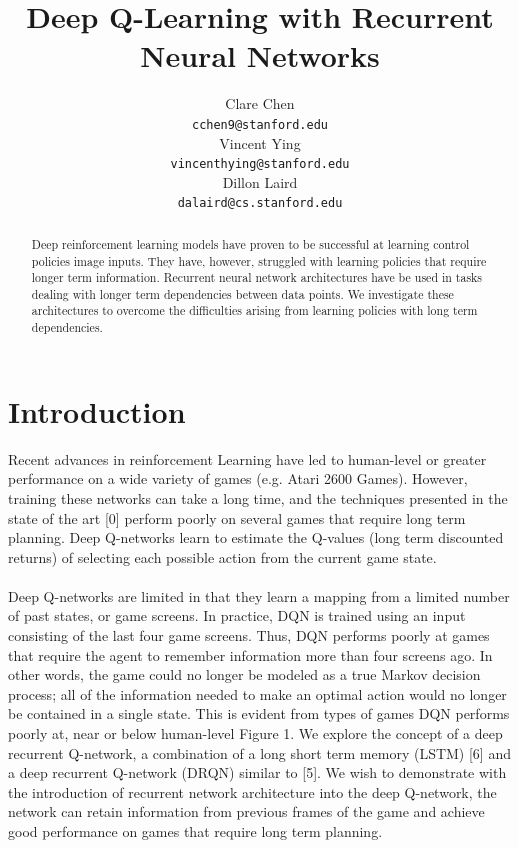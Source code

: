 \documentclass{article}
\title{Deep Q-Learning with Recurrent Neural Networks}
\author{
  Clare Chen \\
  \texttt{cchen9@stanford.edu} \\
  \And
  Vincent Ying \\
  \texttt{vincenthying@stanford.edu} \\
  \And
  Dillon Laird \\
  \texttt{dalaird@cs.stanford.edu} \\
}
\begin{document}

\maketitle

\begin{abstract}
  Deep reinforcement learning models have proven to be successful at learning
  control policies image inputs. They have, however, struggled with learning
  policies that require longer term information. Recurrent neural network
  architectures have be used in tasks dealing with longer term dependencies
  between data points. We investigate these architectures to overcome the
  difficulties arising from learning policies with long term dependencies.
\end{abstract}

\section{Introduction}
    Recent advances in reinforcement Learning have led to human-level or greater
    performance on a wide variety of games (e.g. Atari 2600 Games).  However,
    training these networks can take a long time, and the techniques presented in
    the state of the art [0] perform poorly on several games that require long
    term planning.  Deep Q-networks learn to estimate the Q-values (long term
    discounted returns) of selecting each possible action from the current game
    state. \\
    \\
    Deep Q-networks are limited in that they learn a mapping from a
    limited number of past states, or game screens.  In practice, DQN is trained
    using an input consisting of the last four game screens.  Thus, DQN performs
    poorly at games that require the agent to remember information more than four
    screens ago.  In other words, the game could no longer be modeled as a true
    Markov decision process; all of the information needed to make an optimal
    action would no longer be contained in a single state. This is evident from
    types of games DQN performs poorly at, near or below human-level Figure 1. We
    explore the concept of a deep recurrent Q-network, a combination of a long
    short term memory (LSTM) [6] and a deep recurrent Q-network (DRQN) similar to
    [5].  We wish to demonstrate with the introduction of recurrent network
    architecture into the deep Q-network, the network can retain information from
    previous frames of the game and achieve good performance on games that require
    long term planning. \\
\end{document}
